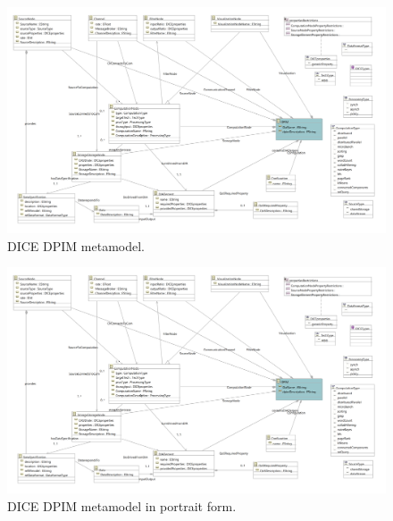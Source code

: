 \begin{figure}
\centering
\includegraphics[width=\textwidth]{Images/11.png}
\caption{\label{fig:metamodel}DICE DPIM metamodel.}
\end{figure}

\begin{figure}
\centering
\includegraphics[width=\textwidth]{Images/11.png}
\caption{\label{fig:metamodel2}DICE DPIM metamodel in portrait form.}
\end{figure}
